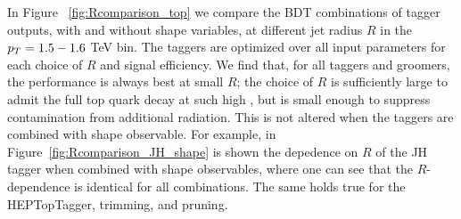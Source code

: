 %
%
%

In Figure ~\ref{fig:Rcomparison_top} we compare the BDT combinations of tagger outputs, with and without shape variables, at different jet radius $R$ in the $p_T=1.5-1.6$ TeV bin. The taggers are optimized over all input parameters for each choice of $R$ and signal efficiency. We find that, for all taggers and groomers, the performance is always best at small $R$; the choice of $R$ is sufficiently large to admit the full top quark decay at such high \pt, but is small enough to suppress contamination from additional radiation. This is not altered when the taggers are combined with shape observable. For example, in Figure~\ref{fig:Rcomparison_JH_shape} is shown the depedence on $R$ of the JH tagger when combined with shape observables, where one can see that the $R$-dependence is identical for all combinations. The same holds true for the HEPTopTagger, trimming, and pruning.

